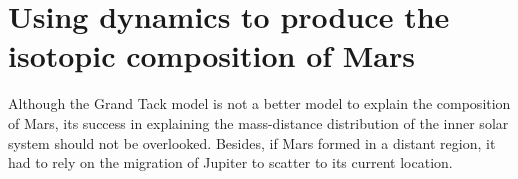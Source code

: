\documentclass{aa}
\begin{document}





\section{Using dynamics to produce the isotopic composition of Mars}
\label{sec:iso_mars}

Although the Grand Tack model is not a better model to explain the composition of Mars, its success in explaining the mass-distance distribution of the inner solar system should not be overlooked. Besides, if Mars formed in a distant region, it had to rely on the migration of Jupiter to scatter to its current location. 
\end{document}
